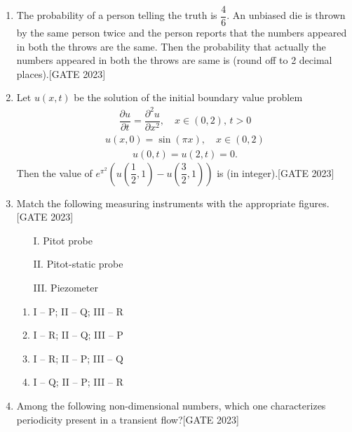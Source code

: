 \documentclass[journal,12pt,onecolumn]{IEEEtran}
\theoremstyle{remark}
\begin{document}
\begin{enumerate}
    \item The probability of a person telling the truth is $\dfrac{4}{6}$. An unbiased die is thrown by the same person twice and the person reports that the numbers appeared in both the throws are the same. Then the probability that actually the numbers appeared in both the throws are same is \underline{\hspace{1cm}} (round off to 2 decimal places).\hfill{[GATE 2023]}

    \item Let $u(x, t)$ be the solution of the initial boundary value problem
    \begin{align*}
    \dfrac{\partial u}{\partial t} = \dfrac{\partial^2 u}{\partial x^2}, \quad x \in (0, 2), \, t > 0
    \end{align*}
    \begin{align*}
    u(x, 0) = \sin(\pi x), \quad x \in (0, 2)
    \end{align*}
    \begin{align*}
    u(0, t) = u(2, t) = 0.
    \end{align*}
    Then the value of $e^{\pi^2} \left( u\left( \dfrac{1}{2}, 1 \right) - u\left( \dfrac{3}{2}, 1 \right) \right)$ is \underline{\hspace{1cm}} (in integer).\hfill{[GATE 2023]}
     \item Match the following measuring instruments with the appropriate figures.\hfill{[GATE 2023]}
    \begin{enumerate}
    \item[I.] Pitot probe
        \item[II.] Pitot-static probe
        \item[III.] Piezometer
    \end{enumerate}
    


    \begin{multicols}{2}
    \begin{enumerate}
        \item I -- P; II -- Q; III -- R
        \item I -- R; II -- Q; III -- P
        \item I -- R; II -- P; III -- Q
        \item I -- Q; II -- P; III -- R
    \end{enumerate}
    \end{multicols}

    \item Among the following non-dimensional numbers, which one characterizes periodicity present in a transient flow?\hfill{[GATE 2023]}
    

\end{enumerate}
\end{document}
